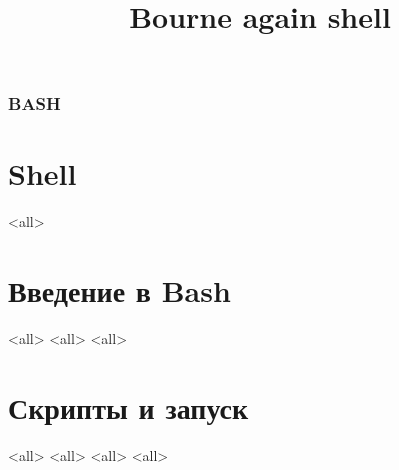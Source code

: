 
\title[bash]{Bourne again shell}




\begin{frame}
	\frametitle{BASH}
	\titlepage
	\vspace{-0.5cm}
	\begin{center}
	\end{center}
\end{frame}

\begin{frame}
	\tableofcontents
\end{frame}




\section{Shell}
\mode<all>{}

\section[Bash intro]{Введение в Bash}
\mode<all>{}
\mode<all>{}
\mode<all>{}

\section[Runtime]{Скрипты и запуск}

\mode<all>{}
\mode<all>{}
\mode<all>{}
\mode<all>{}


